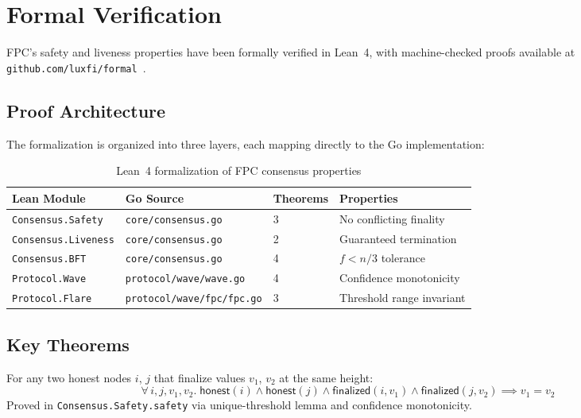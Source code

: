 \section{Formal Verification}

\label{sec:formal}

FPC's safety and liveness properties have been formally verified in Lean~4, with machine-checked proofs available at \texttt{github.com/luxfi/formal}~\cite{luxformal2025}.

\subsection{Proof Architecture}

The formalization is organized into three layers, each mapping directly to the Go implementation:

\begin{table}[h]
\centering
\begin{tabular}{llll}
\toprule
\textbf{Lean Module} & \textbf{Go Source} & \textbf{Theorems} & \textbf{Properties} \\
\midrule
\texttt{Consensus.Safety} & \texttt{core/consensus.go} & 3 & No conflicting finality \\
\texttt{Consensus.Liveness} & \texttt{core/consensus.go} & 2 & Guaranteed termination \\
\texttt{Consensus.BFT} & \texttt{core/consensus.go} & 4 & $f < n/3$ tolerance \\
\texttt{Protocol.Wave} & \texttt{protocol/wave/wave.go} & 4 & Confidence monotonicity \\
\texttt{Protocol.Flare} & \texttt{protocol/wave/fpc/fpc.go} & 3 & Threshold range invariant \\
\bottomrule
\end{tabular}
\caption{Lean~4 formalization of FPC consensus properties}
\label{tab:formal}
\end{table}

\subsection{Key Theorems}

\begin{theorem}
\label{thm:formal-safety}
For any two honest nodes $i$, $j$ that finalize values $v_1$, $v_2$ at the same height:
$$\forall\, i, j, v_1, v_2.\; \mathsf{honest}(i) \land \mathsf{honest}(j) \land \mathsf{finalized}(i, v_1) \land \mathsf{finalized}(j, v_2) \implies v_1 = v_2$$
Proved in \texttt{Consensus.Safety.safety} via unique-threshold lemma and confidence monotonicity.
\end{theorem}

